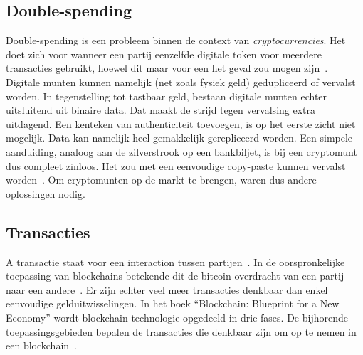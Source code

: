 \subsection{Double-spending}
\label{sub:double-spending}

Double-spending is een probleem binnen de context van \textit{cryptocurrencies}. Het doet zich voor wanneer een partij eenzelfde digitale token voor meerdere transacties gebruikt, hoewel dit maar voor een het geval zou mogen zijn~\autocite{Chohan2021}. Digitale munten kunnen namelijk (net zoals fysiek geld) gedupliceerd of vervalst worden. In tegenstelling tot tastbaar geld, bestaan digitale munten echter uitsluitend uit binaire data. Dat maakt de strijd tegen vervalsing extra uitdagend. Een kenteken van authenticiteit toevoegen, is op het eerste zicht niet mogelijk. Data kan namelijk heel gemakkelijk gerepliceerd worden. Een simpele aanduiding, analoog aan de zilverstrook op een bankbiljet, is bij een cryptomunt dus compleet zinloos. Het zou met een eenvoudige copy-paste kunnen vervalst worden~\autocite{Hoepman2008}. Om cryptomunten op de markt te brengen, waren dus andere oplossingen nodig.


\subsection{Transacties}
\label{sub:transacties}

A transactie staat voor een interaction tussen partijen~\autocite{Salem2008}. In de oorspronkelijke toepassing van blockchains betekende dit de bitcoin-overdracht van een partij naar een andere~\autocite{Pierro2017}. Er zijn echter veel meer transacties denkbaar dan enkel eenvoudige gelduitwisselingen.
In het boek ``Blockchain: Blueprint for a New Economy'' wordt blockchain-technologie opgedeeld in drie fases. De bijhorende toepassingsgebieden bepalen de transacties die denkbaar zijn om op te nemen in een blockchain~\autocite{Swan2015}.

